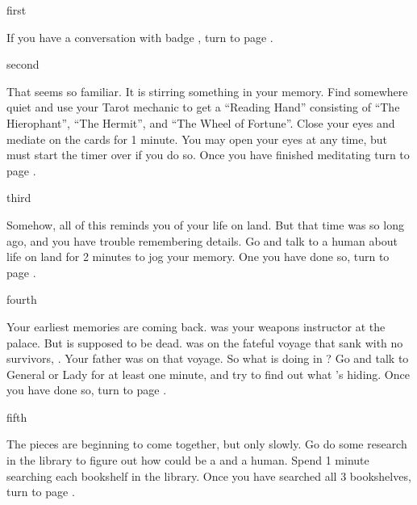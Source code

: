 \documentclass[greennotebook]{NeptuneBall}
\begin{document}

\startnotebook{\nShipwreck{}}

\begin{page}{first}

If you have a conversation with badge \cGeneral{\MYnumber}, turn to page .

\end{page}

\begin{page}{second}

That \cGeneral{\mer} seems so familiar. It is stirring something in your memory. Find somewhere quiet and use your Tarot mechanic to get a ``Reading Hand'' consisting of ``The Hierophant'', ``The Hermit'', and ``The Wheel of Fortune''. Close your eyes and mediate on the cards for 1 minute. You may open your eyes at any time, but must start the timer over if you do so. Once you have finished meditating turn to page .

\end{page}

\begin{page}{third}

Somehow, all of this reminds you of your life on land. But that time was so long ago, and you have trouble remembering details. Go and talk to a human about life on land for 2 minutes to jog your memory. One you have done so, turn to page .

\end{page}

\begin{page}{fourth}

Your earliest memories are coming back. \cGeneral{} was your weapons instructor at the palace. But \cGeneral{\they} is supposed to be dead. \cGeneral{} was on the fateful voyage that sank with no survivors, \cKraken{\MYname}. Your father was on that voyage. So what is \cGeneral{} doing in \pAtlantis{}? Go and talk to General \cGeneral{} or Lady \cQueen{} for at least one minute, and try to find out what \cGeneral{\they}'s hiding.  Once you have done so, turn to page .

\end{page}

\begin{page}{fifth}

The pieces are beginning to come together, but only slowly. Go do some research in the library to figure out how \cGeneral{} could be a \cGeneral{\mer} and a human. Spend 1 minute searching each bookshelf in the library. Once you have searched all 3 bookshelves, turn to page .

\end{page}
\end{document}
